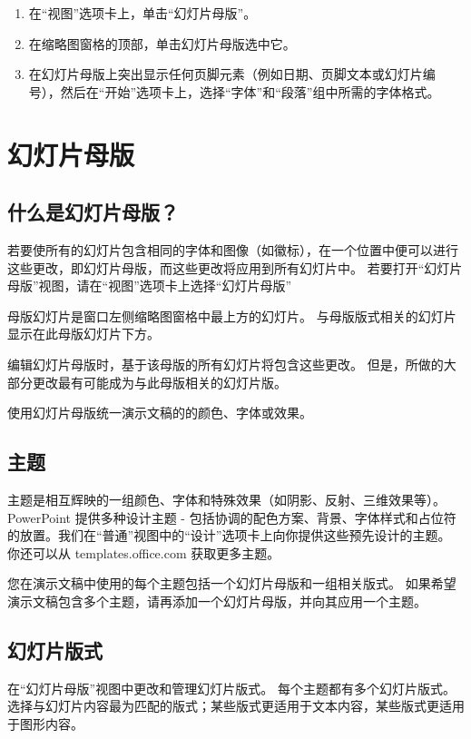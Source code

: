 \begin{enumerate}
    \item 在“视图”选项卡上，单击“幻灯片母版”。
    \item 在缩略图窗格的顶部，单击幻灯片母版选中它。
    \item 在幻灯片母版上突出显示任何页脚元素（例如日期、页脚文本或幻灯片编号），然后在“开始”选项卡上，选择“字体”和“段落”组中所需的字体格式。
\end{enumerate}


\section{幻灯片母版}

\subsection{什么是幻灯片母版？}

若要使所有的幻灯片包含相同的字体和图像（如徽标），在一个位置中便可以进行这些更改，即幻灯片母版，而这些更改将应用到所有幻灯片中。 若要打开“幻灯片母版”视图，请在“视图”选项卡上选择“幻灯片母版”

母版幻灯片是窗口左侧缩略图窗格中最上方的幻灯片。 与母版版式相关的幻灯片显示在此母版幻灯片下方。

编辑幻灯片母版时，基于该母版的所有幻灯片将包含这些更改。 但是，所做的大部分更改最有可能成为与此母版相关的幻灯片版。

使用幻灯片母版统一演示文稿的的颜色、字体或效果。

\subsection{主题}

主题是相互辉映的一组颜色、字体和特殊效果（如阴影、反射、三维效果等）。 PowerPoint 提供多种设计主题 - 包括协调的配色方案、背景、字体样式和占位符的放置。我们在“普通”视图中的“设计”选项卡上向你提供这些预先设计的主题。 你还可以从 templates.office.com 获取更多主题。

您在演示文稿中使用的每个主题包括一个幻灯片母版和一组相关版式。 如果希望演示文稿包含多个主题，请再添加一个幻灯片母版，并向其应用一个主题。

\subsection{幻灯片版式}

在“幻灯片母版”视图中更改和管理幻灯片版式。 每个主题都有多个幻灯片版式。 选择与幻灯片内容最为匹配的版式；某些版式更适用于文本内容，某些版式更适用于图形内容。

